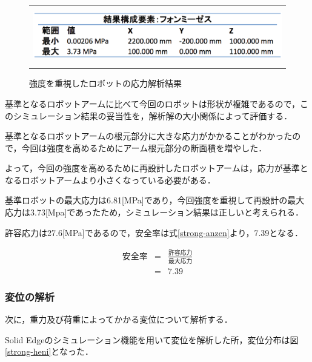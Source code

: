 \begin{figure}[htbp]
  \begin{center}
    \begin{tabular}{c}
      \includegraphics[height=2.5cm]{img/eps/strong-ouryoku-result.eps}
    \end{tabular}
    \caption{強度を重視したロボットの応力解析結果}
    \label{strong-ouryoku-result}
  \end{center}
\end{figure}

基準となるロボットアームに比べて今回のロボットは形状が複雑であるので，このシミュレーション結果の妥当性を，解析解の大小関係によって評価する．

基準となるロボットアームの根元部分に大きな応力がかかることがわかったので，今回は強度を高めるためにアーム根元部分の断面積を増やした．

よって，今回の強度を高めるために再設計したロボットアームは，応力が基準となるロボットアームより小さくなっている必要がある．

基準ロボットの最大応力は6.81{[}MPa{]}であり，今回強度を重視して再設計の最大応力は3.73{[}Mpa{]}であったため，シミュレーション結果は正しいと考えられる．

許容応力は27.6{[}MPa{]}であるので，安全率は式\ref{strong-anzen}より，7.39となる．

\begin{eqnarray}
  安全率 &=& \frac{許容応力}{最大応力} \nonumber \\ &=& 7.39
  \label{strong-anzen}
\end{eqnarray}

\subsubsection{変位の解析}\label{ux5909ux4f4dux306eux89e3ux6790}

次に，重力及び荷重によってかかる変位について解析する．

Solid
Edgeのシミュレーション機能を用いて変位を解析した所，変位分布は図\ref{strong-heni}となった．

